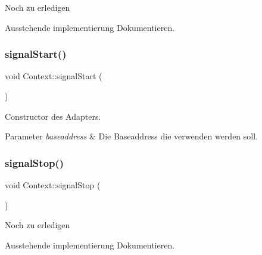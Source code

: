 \begin{DoxyRefDesc}{Noch zu erledigen}
\item[\hyperlink{todo__todo000009}{Noch zu erledigen}]Ausstehende implementierung Dokumentieren. \end{DoxyRefDesc}
\hypertarget{class_context_a9fbe4299614bae2f11e92ed56cde640c}{}\label{class_context_a9fbe4299614bae2f11e92ed56cde640c} 
\subsubsection{\texorpdfstring{signal\+Start()}{signalStart()}\hspace{0.1cm}{\footnotesize\ttfamily [2/2]}}
{\footnotesize\ttfamily void Context\+::signal\+Start (\begin{DoxyParamCaption}{ }\end{DoxyParamCaption})}

Constructor des Adapters.


\begin{DoxyParams}{Parameter}
{\em baseaddress} & Die Baseaddress die verwenden werden soll. \\
\hline
\end{DoxyParams}
\hypertarget{class_context_ac729f3e2184382006588a438622f235f}{}\label{class_context_ac729f3e2184382006588a438622f235f} 
\subsubsection{\texorpdfstring{signal\+Stop()}{signalStop()}\hspace{0.1cm}{\footnotesize\ttfamily [1/2]}}
{\footnotesize\ttfamily void Context\+::signal\+Stop (\begin{DoxyParamCaption}{ }\end{DoxyParamCaption})}

\begin{DoxyRefDesc}{Noch zu erledigen}
\item[\hyperlink{todo__todo000010}{Noch zu erledigen}]Ausstehende implementierung Dokumentieren. \end{DoxyRefDesc}
\hypertarget{class_context_ac729f3e2184382006588a438622f235f}{}\label{class_context_ac729f3e2184382006588a438622f235f} 
